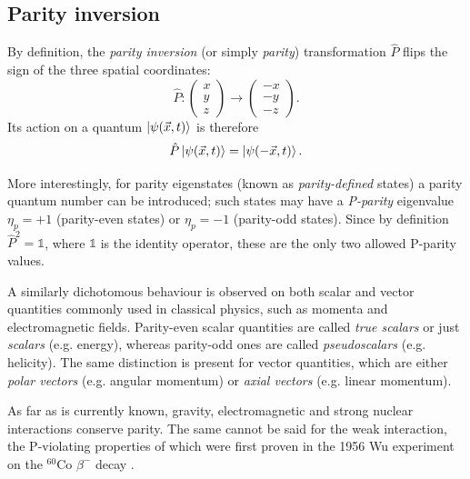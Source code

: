 \subsection{Parity inversion}
By definition, the \textit{parity inversion} (or simply \textit{parity}) transformation $\hat{P}$ flips the sign of the three spatial coordinates:
\begin{equation}
	\hat{P} : \begin{pmatrix}
		x \\ y \\ z
	\end{pmatrix}
	\rightarrow
	\begin{pmatrix}
		-x \\ -y \\ -z
	\end{pmatrix}.
\end{equation}
Its action on a quantum $\ket{\psi(\vec{x},t)}$ is therefore
\begin{equation}
	\hat{P} \ket{\psi(\vec{x},t)} = \ket{\psi(-\vec{x},t)}.
\end{equation}

More interestingly, for parity eigenstates (known as \textit{parity-defined} states) a parity quantum number can be introduced;
such states may have a \textit{P-parity} eigenvalue $\eta_p = +1$ (parity-even states) or $\eta_p = -1$ (parity-odd states).
Since by definition $\hat{P}^2 = \mathds{1}$, where $\mathds{1}$ is the identity operator, these are the only two allowed P-parity values.

A similarly dichotomous behaviour is observed on both scalar and vector quantities commonly used in classical physics, such as momenta and electromagnetic fields.
Parity-even scalar quantities are called \textit{true scalars} or just \textit{scalars} (e.g. energy), whereas parity-odd ones are called \textit{pseudoscalars} (e.g. helicity).
The same distinction is present for vector quantities, which are either \textit{polar vectors} (e.g. angular momentum) or \textit{axial vectors} (e.g. linear momentum).

As far as is currently known, gravity, electromagnetic and strong nuclear interactions conserve parity.
The same cannot be said for the weak interaction, the P-violating properties of which were first proven in the 1956 Wu experiment on the $^{60}\text{Co}$ $\beta^-$ decay \cite{wu}. 

